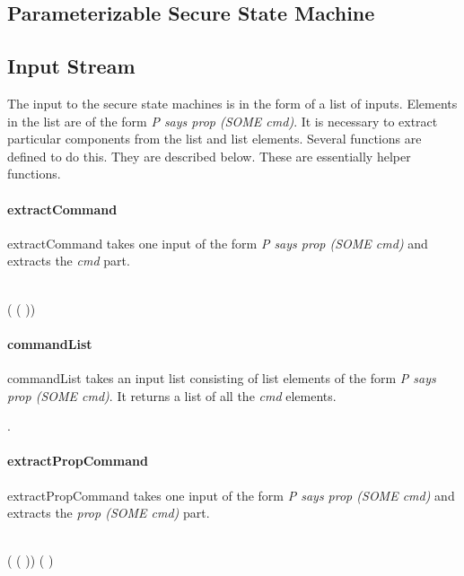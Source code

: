 \documentclass[../../main/main.tex]{subfiles}
\begin{document}
\subsection{Parameterizable Secure State Machine}
\subsection{Input Stream}
The input to the secure state machines is in the form of a list of inputs.  Elements in the list are of the form \textit{P says prop (SOME cmd)}.  It is necessary to extract particular components from the list and list elements.  Several functions are defined to do this.  They are described below.  These are essentially helper functions.

\paragraph*{extractCommand}
extractCommand takes one input of the form \textit{P says prop (SOME cmd)} and extracts the \textit{cmd} part.
\begin{tabbing}
\parskip=8pt
\HOLTokenTurnstile{} \\
\hspace{0.3cm} (   ( )) \HOLSymConst{=} 
\parskip=18pt
\end{tabbing}

\paragraph*{commandList}
commandList takes an input list consisting of list elements of the form \textit{P says prop (SOME cmd)}.  It returns a list of all the \textit{cmd} elements.
\begin{tabbing}
\parskip=8pt
\HOLTokenTurnstile{} \HOLSymConst{\HOLTokenForall{}}. \\
\hspace{0.3cm}   \HOLSymConst{=}   
\parskip=18pt
\end{tabbing}

\paragraph*{extractPropCommand}
extractPropCommand takes one input of the form \textit{P says prop (SOME cmd)} and extracts the \textit{prop (SOME cmd)} part.
\begin{tabbing}
\parskip=8pt
\HOLTokenTurnstile{}\\
\hspace{0.3cm}  (   ( )) \HOLSymConst{=}  ( )
\parskip=18pt
\end{tabbing}
\end{document}
